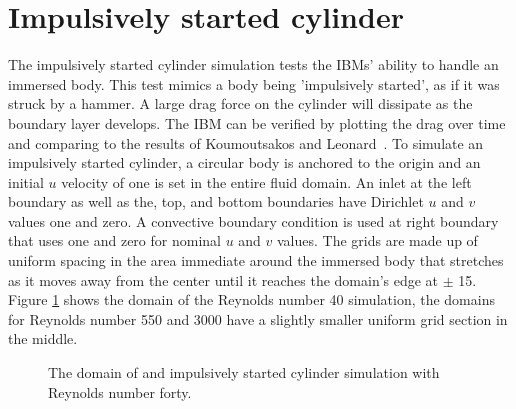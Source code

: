 \documentclass[onehalf,11pt]{beavtex}
\begin{document}
\section{Impulsively started cylinder}
\label{sec:cylinder}
The impulsively started cylinder simulation tests the IBMs' ability to handle an immersed body.
This test mimics a body being 'impulsively started', as if it was struck by a hammer.
A large drag force on the cylinder will dissipate as the boundary layer develops.
The IBM can be verified by plotting the drag over time and comparing to the results of Koumoutsakos and Leonard~\cite{Koumoutsakos:1995bf}.
To simulate an impulsively started cylinder, a circular body is anchored to the origin and an initial $u$ velocity of one is set in the entire fluid domain.
An inlet at the left boundary as well as the, top, and bottom boundaries have  Dirichlet $u$ and $v$ values one and zero.
A convective boundary condition is used at right boundary that uses one and zero for nominal $u$ and $v$ values.
The grids are made up of uniform spacing in the area immediate around the immersed body that stretches as it moves away from the center until it reaches the domain's edge at $\pm$ 15.
Figure \ref{fig:iscylinder} shows the domain of the Reynolds number 40 simulation, the domains for Reynolds number 550 and 3000 have a slightly smaller uniform grid section in the middle.
\begin{figure}[h]
	\centering
	
	\label{fig:iscylinder}
	\caption{The domain of and impulsively started cylinder simulation with Reynolds number forty.}
\end{figure}
\end{document}
